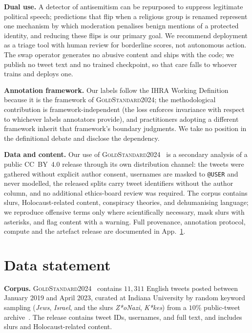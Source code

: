 \documentclass[11pt]{article}
\newcommand{\dataset}{\textsc{GoldStandard2024}\xspace}
\begin{document}
\textbf{Dual use.} A detector of antisemitism can be repurposed to suppress legitimate political speech; predictions that flip when a religious group is renamed represent one mechanism by which moderation penalises benign mentions of a protected identity, and reducing these flips is our primary goal. We recommend deployment as a triage tool with human review for borderline scores, not autonomous action. The swap operator generates no abusive content and ships with the code; we publish no tweet text and no trained checkpoint, so that care falls to whoever trains and deploys one.

\textbf{Annotation framework.} Our labels follow the IHRA Working Definition because it is the framework of \dataset; the methodological contribution is framework-independent (the loss enforces invariance with respect to whichever labels annotators provide), and practitioners adopting a different framework inherit that framework's boundary judgments. We take no position in the definitional debate and disclose the dependency.

\textbf{Data and content.} Our use of \dataset{}~\citep{jikeli2024goldstandard} is a secondary analysis of a public CC~BY~4.0 release through its own distribution channel: the tweets were gathered without explicit author consent, usernames are masked to \texttt{@USER} and never modelled, the released splits carry tweet identifiers without the author column, and no additional ethics-board review was required. The corpus contains slurs, Holocaust-related content, conspiracy theories, and dehumanising language; we reproduce offensive terms only where scientifically necessary, mask slurs with asterisks, and flag content with a warning. Full provenance, annotation protocol, compute and the artefact release are documented in App.~\ref{app:data}.



\appendix

\section{Data statement}
\label{app:data}

\textbf{Corpus.} \dataset{}~\citep{jikeli2024goldstandard} contains $11{,}311$ English tweets posted between January 2019 and April 2023, curated at Indiana University by random keyword sampling (\emph{Jews}, \emph{Israel}, and the slurs \emph{Z*oNazi}, \emph{K*kes}) from a $10\%$ public-tweet archive~\citep{jikeli2023antisemitic}. The release contains tweet IDs, usernames, and full text, and includes slurs and Holocaust-related content.
\end{document}
